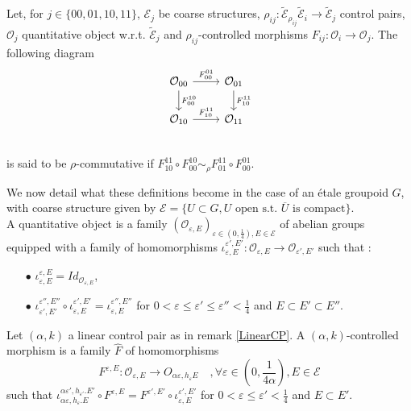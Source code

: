 \begin{definition}
Let, for $j\in\{00,01,10,11\}$, $\mathcal{E}_j$ be coarse structures, $\rho_{ij} :\mathcal{\tilde E}_{\rho_{ij}} \mathcal{\tilde E}_i\rightarrow \mathcal{\tilde E}_j$ control pairs, $\mathcal O_j$ quantitative object w.r.t. $\mathcal{\tilde E}_j$ and $\rho_{ij}$-controlled morphisms $F_{ij} : \mathcal O_i\rightarrow \mathcal O_j$. The following diagram
\[\begin{tikzcd}
\mathcal O_{00}\arrow{r}{F_{00}^{01}}\arrow{d}{F_{00}^{10}} & \mathcal O_{01}\arrow{d}{F_{10}^{11}} \\
\mathcal O_{10}\arrow{r}{F_{10}^{11}} & \mathcal O_{11}\\	 
\end{tikzcd}\]
is said to be $\rho$-commutative if $F_{10}^{11}\circ F_{00}^{10} \sim_\rho F_{01}^{11}\circ F_{00}^{01}$.
\end{definition}

We now detail what these definitions become in the case of an étale groupoid $G$, with coarse structure given by $\mathcal E=\{U\subset G, U\text{ open s.t. }\overline U \text{ is compact}\}$.\\

A quantitative object is a family $(\mathcal O_{\varepsilon,E})_{\varepsilon\in (0,\frac{1}{4}),E\in\mathcal E}$ of abelian groups equipped with a family of homomorphisms $\iota_{\varepsilon,E}^{\varepsilon', E'}: \mathcal O_{\varepsilon,E}\rightarrow \mathcal O_{\varepsilon',E'}$ such that :
\begin{itemize}
\item[$\bullet$] $\iota_{\varepsilon,E}^{\varepsilon, E}=Id_{\mathcal O_{\varepsilon,E}}$,
\item[$\bullet$] $\iota_{\varepsilon',E'}^{\varepsilon'', E''}\circ \iota_{\varepsilon,E}^{\varepsilon', E'}= \iota_{\varepsilon,E}^{\varepsilon'', E''}$ for $0<\varepsilon \leq\varepsilon'\leq \varepsilon''<\frac{1}{4}$ and $E\subset E'\subset E''$.
\end{itemize}

Let $(\alpha,k)$ a linear control pair as in remark \ref{LinearCP}. A $(\alpha,k)$-controlled morphism is a family $\hat F$ of homomorphisms
\[F^{\varepsilon,E} :\mathcal O_{\varepsilon,E}\rightarrow O_{\alpha\varepsilon,h_\varepsilon E} \quad, \forall \varepsilon\in(0,\frac{1}{4\alpha}),E\in\mathcal E \]
such that $\iota_{\alpha\varepsilon,h_\varepsilon. E}^{\alpha\varepsilon',h_{\varepsilon'}. E'}\circ F^{\varepsilon,E} = F^{\varepsilon',E'}\circ\iota_{\varepsilon,E}^{\varepsilon',E'}$ for $0<\varepsilon \leq\varepsilon'<\frac{1}{4}$ and $E\subset E'$.\\

